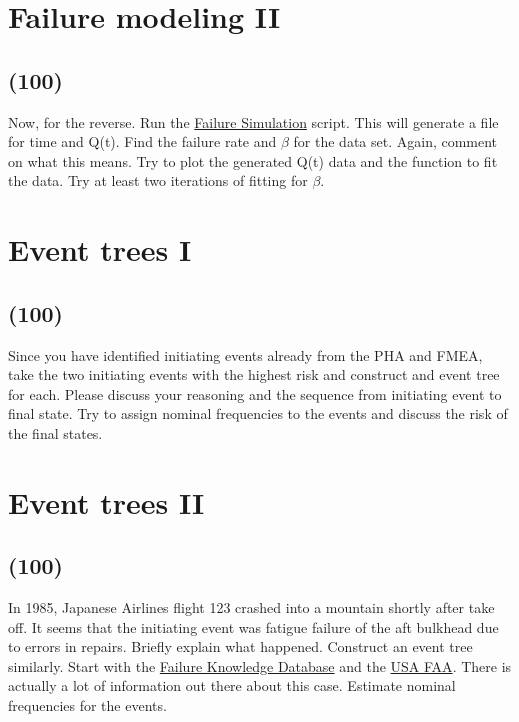 \documentclass[11pt,a4paper]{article}
\begin{document}
\newpage

\section{Failure modeling II}
\subsection*{(100)}
Now, for the reverse. Run the \href{https://github.com/TheDoctorRAB/education/tree/master/src}{Failure Simulation} script. This will generate a file for time and Q(t). Find the failure rate and $\beta$ for the data set. Again, comment on what this means. Try to plot the generated Q(t) data and the function to fit the data. Try at least two iterations of fitting for $\beta$.





\newpage

\section{Event trees I}
\subsection*{(100)}
Since you have identified initiating events already from the PHA and FMEA, take the two initiating events with the highest risk and construct and event tree for each. Please discuss your reasoning and the sequence from initiating event to final state.  Try to assign nominal frequencies to the events and discuss the risk of the final states.
       




\newpage

\section{Event trees II}
\subsection*{(100)}
In 1985, Japanese Airlines flight 123 crashed into a mountain shortly after take off. It seems that the initiating event was fatigue failure of the aft bulkhead due to errors in repairs. Briefly explain what happened. Construct an event tree similarly. Start with the \href{http://www.shippai.org/fkd/en/cfen/CB1071008.html}{Failure Knowledge Database} and the \href{https://lessonslearned.faa.gov/ll_adsearch_results.cfm?TabID=5}{USA FAA}. There is actually a lot of information out there about this case. Estimate nominal frequencies for the events.
       
\end{document}
